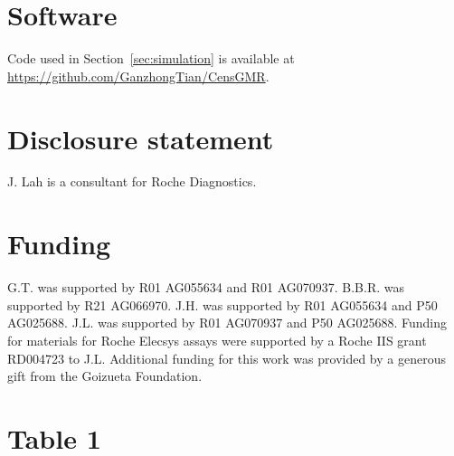 \documentclass{interact}
\newif\ifblind
\theoremstyle{plain}
\theoremstyle{definition}
\theoremstyle{remark}
\begin{document}
\section{Software}
\ifblind
Code used in Section~\ref{sec:simulation} is available at \url{https://github.com/} BLINDED
\else
Code used in Section~\ref{sec:simulation} is available at \url{https://github.com/GanzhongTian/CensGMR}. 
\fi


\section*{Disclosure statement}
\ifblind
Blinded
\else
J. Lah is a consultant for Roche Diagnostics.
\fi
\section*{Funding}

\ifblind
Blinded
\else
G.T. was supported by R01 AG055634 and R01 AG070937. B.B.R. was supported by R21 AG066970. J.H. was supported by R01 AG055634 and P50 AG025688. J.L. was supported by R01 AG070937 and P50 AG025688. Funding for materials for Roche Elecsys assays were supported by a Roche IIS grant RD004723 to J.L. Additional funding for this work was provided by a generous gift from the Goizueta Foundation.
\fi

\pagebreak

\section*{Table 1}
\end{document}
